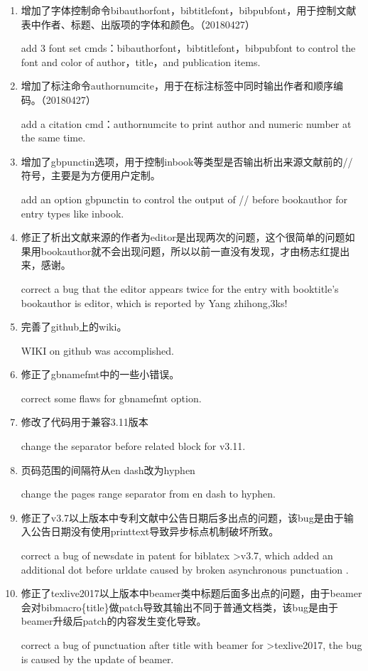 \begin{enumerate}
\item 增加了字体控制命令bibauthorfont，bibtitlefont，bibpubfont，用于控制文献表中作者、标题、出版项的字体和颜色。（20180427）

add 3 font set cmds：bibauthorfont，bibtitlefont，bibpubfont to control the font and color of author，title，and publication items.

\item 增加了标注命令authornumcite，用于在标注标签中同时输出作者和顺序编码。（20180427）

add a citation cmd：authornumcite to print author and numeric number at the same time.

\item 增加了gbpunctin选项，用于控制inbook等类型是否输出析出来源文献前的//符号，主要是为方便用户定制。

add an option gbpunctin to control the output of // before bookauthor for entry types like inbook.

\item 修正了析出文献来源的作者为editor是出现两次的问题，这个很简单的问题如果用bookauthor就不会出现问题，所以以前一直没有发现，才由杨志红提出来，感谢。

correct a bug that the editor appears twice for the entry with booktitle's bookauthor is editor, which is reported by Yang zhihong,3ks!

\item 完善了github上的wiki。

WIKI on github was accomplished.

\item 修正了gbnamefmt中的一些小错误。

correct some flaws for gbnamefmt option.

\item 修改了代码用于兼容3.11版本

change the separator before related block for v3.11.

\item 页码范围的间隔符从en dash改为hyphen

change the pages range separator from en dash to hyphen.
	
\item 修正了v3.7以上版本中专利文献中公告日期后多出点的问题，该bug是由于输入公告日期没有使用printtext导致异步标点机制破坏所致。

correct a bug of newsdate in patent for biblatex >v3.7, which added an additional dot before urldate caused by broken asynchronous punctuation .

\item 修正了texlive2017以上版本中beamer类中标题后面多出点的问题，由于beamer会对bibmacro\{title\}做patch导致其输出不同于普通文档类，该bug是由于beamer升级后patch的内容发生变化导致。

correct a bug of punctuation after title with beamer for >texlive2017, the bug is caused by the update of beamer.
\end{enumerate}





